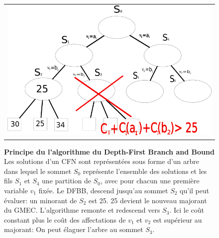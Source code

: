 \begin{figure}[!htbp]
  \centering
  \begin{tabular}{c}
    \includegraphics[width=12cm]{figure/DFBB.png} \\
  \end{tabular}
  \caption{\textbf{Principe du l'algorithme du Depth-First Branch and Bound} Les solutions d'un CFN sont représentées sous forme d'un arbre dans lequel le sommet $S_0$ représente l'ensemble des solutions et les fils $S_1$ et $S_4$ une partition de $S_0$, avec pour chacun une première variable $v_1$ fixée. Le DFBB, descend jusqu'au sommet $S_2$ qu'il peut évaluer: un minorant de $S_2$ est 25. 25 devient le nouveau majorant du GMEC. L'algorithme remonte et redescend vers $S_3$. Ici le coût constant plus le coût des affectations de $v_1$ et $v_2$ est supérieur au majorant: On peut élaguer l'arbre au sommet $S_3$.}
  \label{fig:DFBB}
\end{figure}

